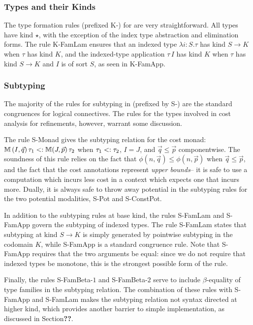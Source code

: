 \subsubsection{Types and their Kinds}
The type formation rules (prefixed K-) for \dlambdaamor are very straightforward. All types have kind $\star$, with the exception of the index type abstraction and elimination forms. The rule K-FamLam ensures that an indexed type $\lambda i : S. \tau$ has kind $S \to K$ when $\tau$ has kind $K$, and the indexed-type application $\tau \, I$ has kind $K$ when $\tau$ has kind $S \to K$ and $I$ is of sort $S$, as seen in K-FamApp.

\subsubsection{Subtyping}
The majority of the rules for subtyping in \dlambdaamor (prefixed by S-) are the standard congruences for logical connectives. The rules for the types involved in cost analysis for refinements, however, warrant some discussion.

The rule S-Monad gives the subtyping relation for the cost monad: $\mathbb{M} \, (I,\vec{q}) \, \tau_1 <: \mathbb{M} (J,\vec{p}) \,\tau_2$ when $\tau_1 <: \tau_2$, $I = J$, and $\vec{q} \leq \vec{p}$ componentwise. The soundness of this rule relies on the fact that $\phi(n,\vec{q}) \leq \phi(n,\vec{p})$ when $\vec{q} \leq \vec{p}$, and the fact that the cost annotations represent \textit{upper bounds}-- it is safe to use a computation which incurs less cost in a context which expects one that incurs more. Dually, it is always safe to throw away potential in the subtyping rules for the two potential modalities, S-Pot and S-ConstPot.

In addition to the subtyping rules at base kind, the rules S-FamLam and S-FamApp govern the subtyping of indexed types. The rule S-FamLam states that subtyping at kind $S \to K$ is simply generated by pointwise subtyping in the codomain $K$, while S-FamApp is a standard congruence rule. Note that S-FamApp requires that the two arguments be equal: since we do not require that indexed types be monotone, this is the strongest possible form of the rule.

Finally, the rules S-FamBeta-$1$ and S-FamBeta-$2$ serve to include $\beta$-equality of type families in the subtyping relation. The combination of these rules with S-FamApp and S-FamLam makes the subtyping relation not syntax directed at higher kind, which provides another barrier to simple implementation, as discussed in Section\textbf{??}.

